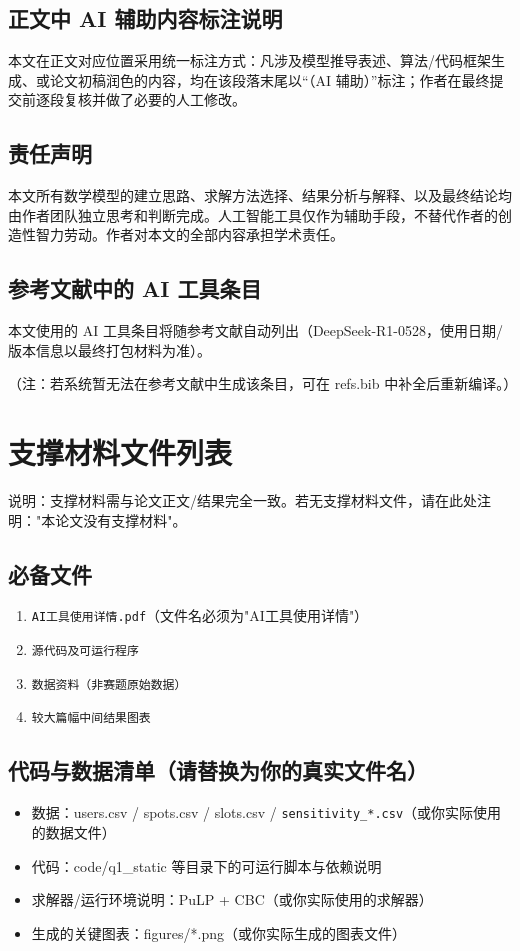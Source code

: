 \documentclass[12pt,a4paper]{ctexart}
\begin{document}
\subsection{正文中 AI 辅助内容标注说明}
本文在正文对应位置采用统一标注方式：凡涉及模型推导表述、算法/代码框架生成、或论文初稿润色的内容，均在该段落末尾以``（AI 辅助）''标注；作者在最终提交前逐段复核并做了必要的人工修改。

\subsection{责任声明}

本文所有数学模型的建立思路、求解方法选择、结果分析与解释、以及最终结论均由作者团队独立思考和判断完成。人工智能工具仅作为辅助手段，不替代作者的创造性智力劳动。作者对本文的全部内容承担学术责任。

\subsection{参考文献中的 AI 工具条目}
本文使用的 AI 工具条目将随参考文献自动列出（DeepSeek-R1-0528，使用日期/版本信息以最终打包材料为准）。

（注：若系统暂无法在参考文献中生成该条目，可在 refs.bib 中补全后重新编译。）

\newpage



\newpage
\appendix


\section{支撑材料文件列表}

说明：支撑材料需与论文正文/结果完全一致。若无支撑材料文件，请在此处注明："本论文没有支撑材料"。

\subsection{必备文件}
\begin{enumerate}
  \item \texttt{AI工具使用详情.pdf}（文件名必须为"AI工具使用详情"）
  \item \texttt{源代码及可运行程序}
  \item \texttt{数据资料（非赛题原始数据）}
  \item \texttt{较大篇幅中间结果图表}
\end{enumerate}

\subsection{代码与数据清单（请替换为你的真实文件名）}
\begin{itemize}
  \item 数据：users.csv / spots.csv / slots.csv / \texttt{sensitivity_*.csv}（或你实际使用的数据文件）
  \item 代码：code/q1_static 等目录下的可运行脚本与依赖说明
  \item 求解器/运行环境说明：PuLP + CBC（或你实际使用的求解器）
  \item 生成的关键图表：figures/*.png（或你实际生成的图表文件）
\end{itemize}
\end{document}
